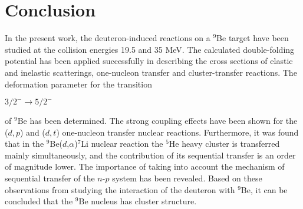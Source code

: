 \documentclass[
12pt, %
oneside, %
english, %
onehalfspacing, %
onehalfspacing, %
headsepline, %
]{MastersDoctoralThesis} %
\begin{document}
\chapter*{Conclusion}   


In the present work, the deuteron-induced reactions on a ${}^9$Be target have been studied at the collision energies 19.5 and 35 MeV.
The calculated double-folding potential has been applied successfully in describing the cross sections of elastic and inelastic scatterings, one-nucleon  transfer and cluster-transfer reactions.
  The deformation parameter for the transition \begin{small}
  $3/2^-\rightarrow5/2^-$
\end{small}  of ${}^9$Be has been determined.
 The strong coupling effects have been shown for the ($d,p$) and ($d,t$) one-nucleon transfer nuclear reactions.
 Furthermore, it was found that  in the ${}^9$Be($d$,$\alpha$)${}^7$Li nuclear reaction the ${}^5$He heavy cluster  is transferred mainly simultaneously, and the contribution of its sequential transfer is an order of magnitude lower.
 The importance of taking into account the mechanism of sequential transfer of the $n$-$p$ system has been revealed.
 Based on these observations from studying the interaction of the  deuteron with  $^9$Be, it can be concluded that the $^9$Be  nucleus has cluster structure.
 
% 
%
% 
% 


\appendix %




%


\printbibliography[heading=bibintoc]

\end{document}
